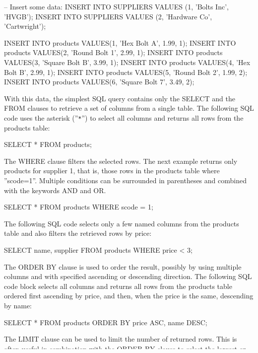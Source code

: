 \begin{sqlcode}
-- Insert some data:
INSERT INTO SUPPLIERS VALUES (1, 'Bolts Inc', 'HVGB');
INSERT INTO SUPPLIERS VALUES (2, 'Hardware Co', 'Cartwright');

INSERT INTO products VALUES(1, 'Hex Bolt A', 1.99, 1);
INSERT INTO products VALUES(2, 'Round Bolt 1', 2.99, 1);
INSERT INTO products VALUES(3, 'Square Bolt B', 3.99, 1);
INSERT INTO products VALUES(4, 'Hex Bolt B', 2.99, 1);
INSERT INTO products VALUES(5, 'Round Bolt 2', 1.99, 2);
INSERT INTO products VALUES(6, 'Square Bolt 7', 3.49, 2);
\end{sqlcode}

With this data, the simplest SQL query contains only the SELECT and the FROM clauses to retrieve a set of columns from a single table. The following SQL code uses the asterisk (''\texttt{*}'') to select all columns and returns all rows from the products table:

\begin{sqlcode}
SELECT * FROM products;
\end{sqlcode}

The WHERE clause filters the selected rows. The next example returns only products for supplier 1, that is, those rows in the products table where ''scode=1''. Multiple conditions can be surrounded in parentheses and combined with the keywords AND and OR.

\begin{sqlcode}
SELECT * FROM products WHERE scode = 1;
\end{sqlcode}

The following SQL code selects only a few named columns from the products table and also filters the retrieved rows by price:

\begin{sqlcode}
SELECT name, supplier FROM products WHERE price < 3;
\end{sqlcode}

The ORDER BY clause is used to order the result, possibly by using multiple columns and with specified ascending or descending direction. The following SQL code block selects all columns and returns all rows from the products table ordered first ascending by price, and then, when the price is the same, descending by name:

\begin{sqlcode}
SELECT * FROM products ORDER BY price ASC, name DESC;
\end{sqlcode}

The LIMIT clause can be used to limit the number of returned rows. This is often useful in combination with the ORDER BY clause to select the largest or smallest values. The following example demonstrates this by retrieving the name of the cheapest three products from the products table:


